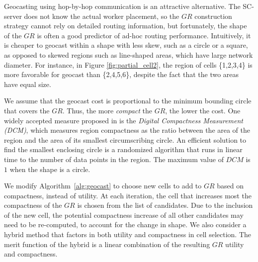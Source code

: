 \documentclass{USC-Thesis}
\numberwithin{equation}{chapter}
\begin{document}
Geocasting using hop-by-hop communication is an attractive alternative. The SC-server does not know the actual worker placement, so the $\mathit{GR}$ construction strategy cannot rely on detailed routing information, but fortunately, the shape of the $\mathit{GR}$ is often a good predictor of ad-hoc routing performance. Intuitively, it is cheaper to geocast within a shape with less skew, such as a circle or a square, as opposed to skewed regions such as line-shaped areas, which have large network diameter. For instance, in Figure \ref{fig:partial_cell2}, the region of cells \{1,2,3,4\} is more favorable for geocast than \{2,4,5,6\}, despite the fact that the two areas have equal size. 

We assume that the geocast cost is proportional to the minimum bounding circle that covers the $\mathit{GR}$. Thus, the more {\em compact} the $\mathit{GR}$, the lower the cost. One widely accepted measure proposed in \cite{kim1984digital} is the {\em Digital Compactness Measurement (DCM)}, which measures region compactness as the ratio between the area of the region and the area of its smallest circumscribing circle. An efficient solution to find the smallest enclosing circle is a randomized algorithm \cite{welzl1991smallest} that runs in linear time to the number of data points in the region. The maximum value of $\mathit{DCM}$ is $1$ when the shape is a circle.

We modify Algorithm~\ref{alg:geocast} to choose new cells to add to $\mathit{GR}$ based on compactness, instead of utility. At each iteration, the cell that increases most the compactness of the $\mathit{GR}$ is chosen from the list of candidates. Due to the inclusion of the new cell, the potential compactness increase of all other candidates may need to be re-computed, to account for the change in shape. 
We also consider a hybrid method that factors in both utility and compactness in cell selection. The merit function of the hybrid is a linear combination of the resulting $\mathit{GR}$ utility and compactness. 
\end{document}
